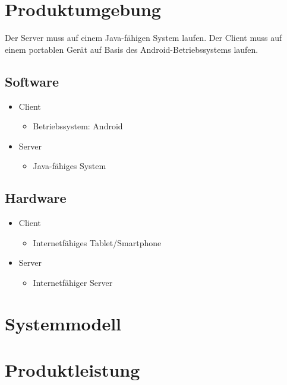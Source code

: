 \documentclass[a4paper,10pt]{scrartcl}
\begin{document}
\section{Produktumgebung}
Der Server muss auf einem Java-fähigen System laufen.
Der Client muss auf einem portablen Gerät auf Basis des Android-Betriebssystems laufen.
\subsection{Software}
\begin{itemize}
\item Client
   \begin{itemize}
      \item Betriebssystem: Android
   \end{itemize}
\item Server
   \begin{itemize}
      \item Java-fähiges System
   \end{itemize}
\end{itemize}

\subsection{Hardware}
\begin{itemize}
\item Client
   \begin{itemize}
      \item Internetfähiges Tablet/Smartphone
   \end{itemize}
\item Server
   \begin{itemize}
      \item Internetfähiger Server
   \end{itemize}
\end{itemize}

\section{Systemmodell}




\section{Produktleistung}
\end{document}
